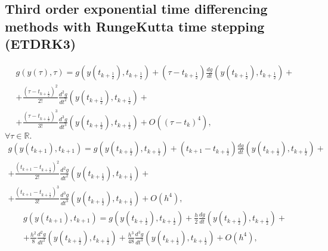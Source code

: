 \documentclass[letterpaper,10pt,english]{jupyterBook}
\begin{document}
\subsection{Third order exponential time differencing methods with Runge\sphinxhyphen{}Kutta time stepping (ETDRK\sphinxhyphen{}3)}
\label{\detokenize{appendix:third-order-exponential-time-differencing-methods-with-runge-kutta-time-stepping-etdrk-3}}\begin{equation*}
\begin{split}
    g(y(\tau), \tau) = g\left(y\left(t_{k+\frac{1}{2}}\right), t_{k+\frac{1}{2}}\right) +
    \left(\tau - t_{k+\frac{1}{2}}\right) \frac{dg}{dt} \left(y\left(t_{k+\frac{1}{2}}\right), t_{k+\frac{1}{2}}\right) + \\
    + \frac{\left(\tau - t_{k+\frac{1}{2}}\right)^2}{2!} \frac{d^2g}{dt^2} \left(y\left(t_{k+\frac{1}{2}}\right), t_{k+\frac{1}{2}}\right) + \\
    + \frac{\left(\tau - t_{k+\frac{1}{2}}\right)^3}{3!} \frac{d^3g}{dt^3} \left(y\left(t_{k+\frac{1}{2}}\right), t_{k+\frac{1}{2}}\right)
    + O((\tau - t_k)^4),
\end{split}
\end{equation*}
\sphinxAtStartPar
\(\forall \tau \in \mathbb{R}.\)
\begin{equation*}
\begin{split}
    g(y(t_{k+1}), t_{k+1}) = g\left(y\left(t_{k+\frac{1}{2}}\right), t_{k+\frac{1}{2}}\right) +
    \left(t_{k+1} - t_{k+\frac{1}{2}}\right) \frac{dg}{dt} \left(y\left(t_{k+\frac{1}{2}}\right), t_{k+\frac{1}{2}}\right) + \\
    + \frac{\left(t_{k+1} - t_{k+\frac{1}{2}}\right)^2}{2!} \frac{d^2g}{dt^2} \left(y\left(t_{k+\frac{1}{2}}\right), t_{k+\frac{1}{2}}\right) + \\
    + \frac{\left(t_{k+1} - t_{k+\frac{1}{2}}\right)^3}{3!} \frac{d^3g}{dt^3} \left(y\left(t_{k+\frac{1}{2}}\right), t_{k+\frac{1}{2}}\right)
    + O(h^4),
\end{split}
\end{equation*}\begin{equation*}
\begin{split}
    g(y(t_{k+1}), t_{k+1}) = g\left(y\left(t_{k+\frac{1}{2}}\right), t_{k+\frac{1}{2}}\right) +
    \frac{h}{2} \frac{dg}{dt} \left(y\left(t_{k+\frac{1}{2}}\right), t_{k+\frac{1}{2}}\right) + \\
    +\frac{h^2}{8} \frac{d^2g}{dt^2} \left(y\left(t_{k+\frac{1}{2}}\right), t_{k+\frac{1}{2}}\right)
    + \frac{h^3}{48} \frac{d^3g}{dt^3} \left(y\left(t_{k+\frac{1}{2}}\right), t_{k+\frac{1}{2}}\right)
    + O(h^4),
\end{split}
\end{equation*}
\end{document}

